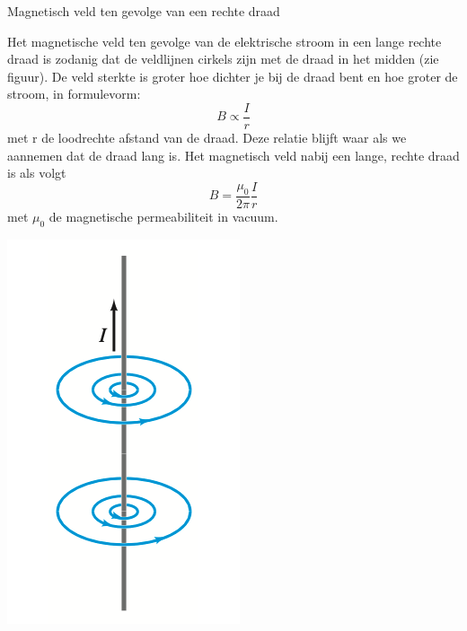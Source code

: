 \begin{app}{Magnetisch veld ten gevolge van een rechte draad}
    \begin{minipage}{0.87\textwidth}
        Het magnetische veld ten gevolge van de elektrische stroom in een lange rechte draad is zodanig dat de
        veldlijnen cirkels zijn met de draad in het midden (zie figuur). De veld sterkte is groter hoe dichter je bij de
        draad bent en hoe groter de stroom, in formulevorm:
        \begin{equation*}
            B \propto \dfrac{I}{r}
        \end{equation*}
        met r de loodrechte afstand van de draad. Deze relatie blijft waar als we aannemen dat de draad lang is.
        Het magnetisch veld nabij een lange, rechte draad is als volgt
        \begin{equation*}
            B = \dfrac{\mu_0}{2\pi}\dfrac{I}{r}
        \end{equation*}
        met $\mu_0$ de magnetische permeabiliteit in vacuum.
    \end{minipage}
    \begin{minipage}{.09\textwidth}
        \includegraphics[scale=0.225]{Images/Magnetisme/MagnetischVeldTenGevolgeRechteDraad}
    \end{minipage}
\end{app}

